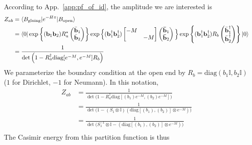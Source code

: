 \documentclass{article}
\renewcommand{\vec}[1]{\boldsymbol{\mathbf{#1}}}
\begin{document}
According to App.~\ref{app:pf_of_id}, the amplitude we are interested is
\begin{equation}
\begin{aligned}
Z_{ab} &= \langle B_{\rm gluing} | e^{- H\pi } | B_{\rm open}  \rangle \\
&= \langle 0 | 
\exp\left\{ ( \vec{b}_1 \vec{b}_2 ) R^*_a
\begin{pmatrix}
  \bar{\vec{b}}_1\\
  \bar{\vec{b}}_2\\
\end{pmatrix}\right\} 
\exp \Big\{ (\vec{b}_1^{\dagger} \vec{b}_2^{\dagger} ) 
\begin{bmatrix}
-M & \\
& -M 
\end{bmatrix}
\begin{pmatrix}
\vec{\bar{b}}_1\\
\vec{\bar{b}}_2
\end{pmatrix}\Big\} 
\exp\left\{ ( \vec{b}^{\dagger}_1 \vec{b}^{\dagger}_2 ) R_b
\begin{pmatrix}
  \bar{\vec{b}}^{\dagger}_1\\
  \bar{\vec{b}}^{\dagger}_2\\
\end{pmatrix}\right\} 
| 0 \rangle \\
& =  \frac{1}{\det\Big(1 - R_a^{\dagger} \text{diag}[e^{-M}, e^{-M} ] R_b \Big)} \\
\end{aligned}
\end{equation}
We parameterize the boundary condition at the open end by $R_b = \text{diag}(b_1 \mathbb{I} , b_2 \mathbb{I})$($1$ for Dirichlet, $-1$ for Neumann). In this notation,
\begin{equation}
\begin{aligned}
Z_{ab} & = \frac{1}{\det\Big(1 - R_a^{\dagger} \text{diag}[(b_1)e^{-M}, (b_2)e^{-M} ]\Big)} \\
& = \frac{1}{\det\Big(1 - ( S_1 \otimes \mathbb{I})  ( \text{diag}[(b_1), (b_2) ]\otimes e^{-M } ) \Big)} \\
& = \frac{1}{\det\Big(S^{-1}_1 \otimes \mathbb{I}  -  ( \text{diag}[(b_1), (b_2) ]\otimes e^{-M } ) \Big)} \\
\end{aligned}
\end{equation}
The Casimir energy from this partition function is thus 
\end{document}
